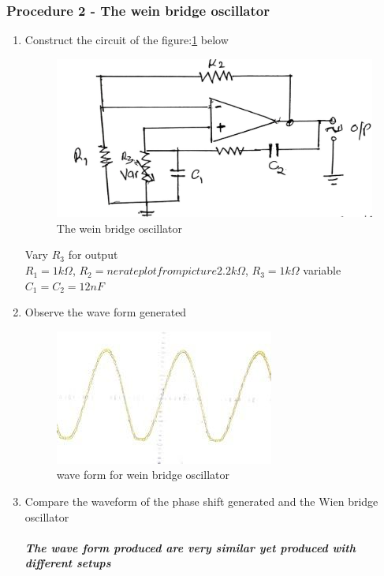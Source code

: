 \documentclass[12pt,a4paper]{article}
\begin{document}
    \subsubsection{Procedure 2 - The wein bridge oscillator}
    \begin{enumerate}
        \item Construct the circuit of the figure:\ref{fig:2} below
        \begin{figure}[H]
            \centering
            \includegraphics[width=0.5\linewidth]{circuit2_2.jpeg}
            \caption{The wein bridge oscillator}
            \label{fig:2}
        \end{figure}
        Vary $R_3$ for output\\
        $R_1 = 1k \Omega$, $R_2 = nerate plot from picture2.2k \Omega$, $R_3 = 1k \Omega$ variable\\
        $ C_1 = C_2 = 12nF$
        \item Observe the wave form generated
        \begin{figure}[H]
            \centering
            \includegraphics[width=0.5\linewidth]{2.jpeg}
            \caption{wave form for wein bridge oscillator}
            \label{fig:enter-label}
        \end{figure}
        \item Compare the waveform of the phase shift generated and the Wien bridge oscillator\\
        \\
        \textbf{\textit{The wave form produced are very similar yet produced with different setups}}\\
    \end{enumerate}
\end{document}

